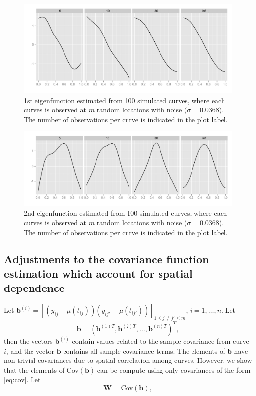 \begin{figure}
\includegraphics[width=\textwidth]{images/Ch3/eigenfun1-sig-0368.pdf}
\caption{1st eigenfunction estimated from 100 simulated curves, where each curves is observed at $m$ random locations with noise ($\sigma = 0.0368$). The number of observations per curve is indicated in the plot label. }
\end{figure}

\begin{figure}
\includegraphics[width=\textwidth]{images/Ch3/eigenfun2-sig-0368.pdf}
\caption{2nd eigenfunction estimated from 100 simulated curves, where each curves is observed at $m$ random locations with noise ($\sigma = 0.0368$). The number of observations per curve is indicated in the plot label. }
\end{figure}

\newpage
\subsection{Adjustments to the covariance function estimation which account for spatial dependence}

Let $\mathbf{b}^{(i)} = [(y_{ij}-\mu(t_{ij}))(y_{ij'}-\mu(t_{ij'}))]_{1\leq j\neq j'\leq m}$, $i=1, \dots, n$. Let
\[
\mathbf{b} = (\mathbf{b}^{(1)T}, \mathbf{b}^{(2)T}, \dots, \mathbf{b}^{(n)T}   )^T,
\]
then the vectors $\mathbf{b}^{(i)}$ contain values related to the sample covariance from curve $i$, and the vector $\mathbf{b}$ contains all sample covariance terms. 
 	The elements of $\mathbf{b}$ have non-trivial covariances due to spatial correlation among curves. However, we show that the elements of Cov$(\mathbf{b})$ can be compute using only covariances of the form \eqref{eq:cov}. Let
\[
\mathbf{W}= \text{Cov}(\mathbf{b}), 
\]

